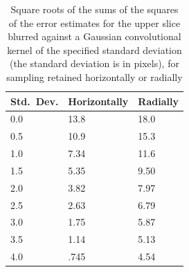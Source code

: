 \documentclass[article]{jdssv}
\begin{document}
\begin{table}

\vspace{.125in}

\caption{Square roots of the sums of the squares of the error estimates
for the upper slice blurred against a Gaussian convolutional kernel
of the specified standard deviation (the standard deviation is in pixels),
for sampling retained horizontally or radially}
\label{blurs10}
\begin{centering}

\vspace{.125in}

\begin{tabular}{lll}
\hline Std.\ Dev. & Horizontally & Radially \\\hline
       0.0 &         13.8 &     18.0 \\
       0.5 &         10.9 &     15.3 \\
       1.0 &         7.34 &     11.6 \\
       1.5 &         5.35 &     9.50 \\
       2.0 &         3.82 &     7.97 \\
       2.5 &         2.63 &     6.79 \\
       3.0 &         1.75 &     5.87 \\
       3.5 &         1.14 &     5.13 \\
       4.0 &         .745 &     4.54 \\\hline
\end{tabular}

\end{centering}
\end{table}





\clearpage





\end{document}
